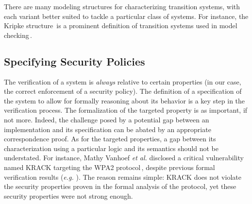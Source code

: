 There are many modeling structures for characterizing transition systems, with
each variant better suited to tackle a particular class of systems.
%
For instance, the Kripke structure\,\cite{kripke1971semantical} is a prominent
definition of transition systems used in model checking\,\cite{clarke1999model}.


\subsection{Specifying Security Policies}
\label{subsec:sota:security}

The verification of a system is \emph{always} relative to certain properties (in
our case, the correct enforcement of a security policy).
%
The definition of a specification of the system to allow for formally reasoning
about its behavior is a key step in the verification process.
%
The formalization of the targeted property is as important, if not more.
%
Indeed, the challenge posed by a potential gap between an implementation and its
specification can be abated by an appropriate correspondence proof. 
%
As for the targeted properties, a gap between its characterization using a
particular logic and its semantics should not be understated.
%
For instance, Mathy Vanhoef \emph{et al.} disclosed a critical vulnerability
named KRACK targeting the WPA2 protocol\,\cite{vanhoef2017key}, despite previous
formal verification results (\emph{e.g.} \cite{he2004analysis}).
%
The reason remains simple: KRACK does not violate the security properties proven
in the formal analysis of the protocol, yet these security properties were not
strong enough. 

